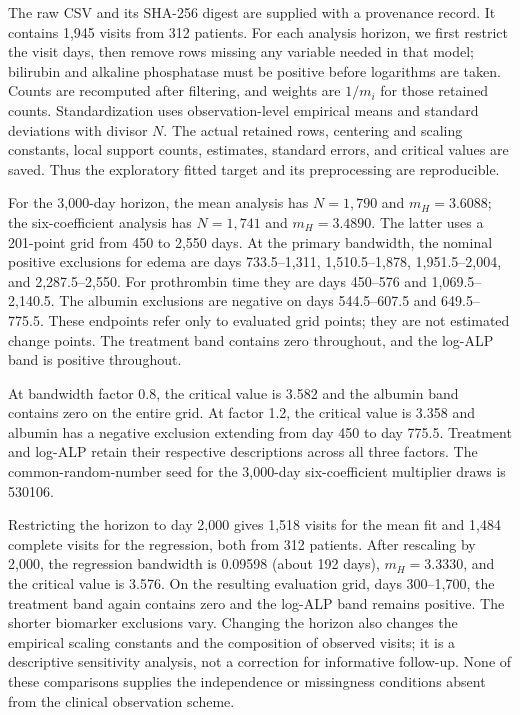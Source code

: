 The raw CSV and its SHA-256 digest are supplied with a provenance record. It contains 1,945 visits from 312 patients. For each analysis horizon, we first restrict the visit days, then remove rows missing any variable needed in that model; bilirubin and alkaline phosphatase must be positive before logarithms are taken. Counts are recomputed after filtering, and weights are $1/m_i$ for those retained counts. Standardization uses observation-level empirical means and standard deviations with divisor $N$. The actual retained rows, centering and scaling constants, local support counts, estimates, standard errors, and critical values are saved. Thus the exploratory fitted target and its preprocessing are reproducible.

For the 3,000-day horizon, the mean analysis has $N=1{,}790$ and $m_H=3.6088$; the six-coefficient analysis has $N=1{,}741$ and $m_H=3.4890$. The latter uses a 201-point grid from 450 to 2,550 days. At the primary bandwidth, the nominal positive exclusions for edema are days 733.5--1,311, 1,510.5--1,878, 1,951.5--2,004, and 2,287.5--2,550. For prothrombin time they are days 450--576 and 1,069.5--2,140.5. The albumin exclusions are negative on days 544.5--607.5 and 649.5--775.5. These endpoints refer only to evaluated grid points; they are not estimated change points. The treatment band contains zero throughout, and the log-ALP band is positive throughout.

At bandwidth factor 0.8, the critical value is 3.582 and the albumin band contains zero on the entire grid. At factor 1.2, the critical value is 3.358 and albumin has a negative exclusion extending from day 450 to day 775.5. Treatment and log-ALP retain their respective descriptions across all three factors. The common-random-number seed for the 3,000-day six-coefficient multiplier draws is 530106.

Restricting the horizon to day 2,000 gives 1,518 visits for the mean fit and 1,484 complete visits for the regression, both from 312 patients. After rescaling by 2,000, the regression bandwidth is 0.09598 (about 192 days), $m_H=3.3330$, and the critical value is 3.576. On the resulting evaluation grid, days 300--1,700, the treatment band again contains zero and the log-ALP band remains positive. The shorter biomarker exclusions vary. Changing the horizon also changes the empirical scaling constants and the composition of observed visits; it is a descriptive sensitivity analysis, not a correction for informative follow-up. None of these comparisons supplies the independence or missingness conditions absent from the clinical observation scheme.
\FloatBarrier


